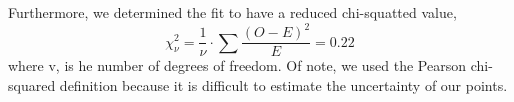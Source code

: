 \documentclass{article}
\begin{document}
Furthermore, we determined the fit to have a reduced chi-squatted value,
\begin{equation} 
\chi^2_\nu = \frac{1}{\nu} \cdot \sum \frac{(O - E)^2}{E} = 0.22
\end{equation}
where v, is he number of degrees of freedom. Of note, we used the Pearson chi-squared definition because it is difficult to estimate the uncertainty of our points.


\nocite{*}
\end{document}
